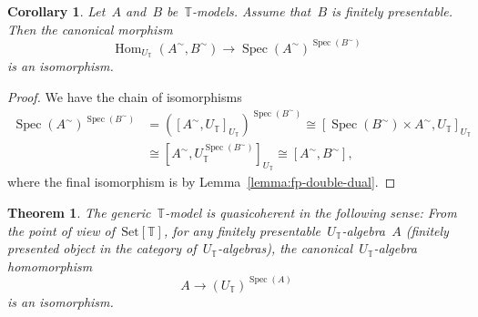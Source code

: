 \documentclass[oneside,reqno]{amsart}
\theoremstyle{definition}
\theoremstyle{plain}
\newtheorem{cor}[defn]{Corollary}
\newtheorem{thm}[defn]{Theorem}
\theoremstyle{remark}
\newcommand{\TT}{\mathbb{T}}
\DeclareMathOperator{\Spec}{Spec}
\DeclareMathOperator{\Hom}{Hom}
\newcommand{\Set}{\mathrm{Set}}
\renewcommand{\_}{\mathpunct{.}\,}
\newcommand{\?}{\,{:}\,}
\begin{document}
\begin{cor}Let~$A$ and~$B$ be~$\TT$-models. Assume that~$B$ is finitely
presentable. Then the canonical morphism
\[ \Hom_{U_\TT}(A^\sim, B^\sim) \longrightarrow \Spec(A^\sim)^{\Spec(B^\sim)}
\]
is an isomorphism.
\end{cor}

\begin{proof}We have the chain of isomorphisms
\begin{align*}
  \Spec(A^\sim)^{\Spec(B^\sim)} &=
  ([A^\sim,U_\TT]_{U_\TT})^{\Spec(B^\sim)} \cong
  [\Spec(B^\sim) \times A^\sim, U_\TT]_{U_\TT} \\
  &\cong
  [A^\sim, U_\TT^{\Spec(B^\sim)}]_{U_\TT} \cong
  [A^\sim, B^\sim],
\end{align*}
where the final isomorphism is by Lemma~\ref{lemma:fp-double-dual}.
\end{proof}

\begin{thm}The generic~$\TT$-model is \emph{quasicoherent} in the following sense:
From the point of view of~$\Set[\TT]$, for any finitely
presentable~$U_\TT$-algebra~$A$ (finitely presented object in the category
of~$U_\TT$-algebras), the canonical~$U_\TT$-algebra homomorphism
\[ A \longrightarrow (U_\TT)^{\Spec(A)} \]
is an isomorphism.
\end{thm}
\end{document}
